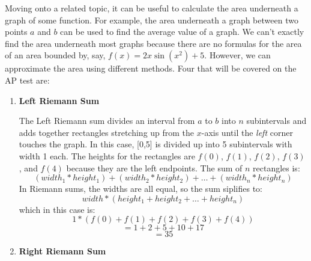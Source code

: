\documentclass[../revisedmain.tex]{subfiles}
\begin{document}
Moving onto a related topic, it can be useful to calculate the area underneath a graph of some function. For example, the area underneath a graph between two points $a$ and $b$ can be used to find the average value of a graph. We can't exactly find the area underneath most graphs because there are no formulas for the area of an area bounded by, say, $f(x)=2x\sin(x^2)+5$. However, we can approximate the area using different methods. Four that will be covered on the AP test are:
\newpage
\begin{enumerate}
	\item \textbf{Left Riemann Sum}
	\begin{center}
	\end{center}
	The Left Riemann sum divides an interval from $a$ to $b$ into $n$ subintervals and adds together rectangles stretching up from the $x$-axis until the \textit{left} corner touches the graph. In this case, [0,5] is divided up into 5 subintervals with width 1 each. The heights for the rectangles are $f(0)$, $f(1)$, $f(2)$, $f(3)$, and $f(4)$ because they are the left endpoints. The sum of $n$ rectangles is:$$(width_1*height_1) + (width_2*height_2) + \dots +(width_n*height_n)$$ In Riemann sums, the widths are all equal, so the sum siplifies to:$$width*(height_1+height_2+\dots+height_n)$$ which in this case is:$$1*\left(f(0)+f(1)+f(2)+f(3)+f(4)\right)$$$$=1+2+5+10+17$$$$=35$$
	\item \textbf{Right Riemann Sum}
		\begin{center}
\end{center}
\end{enumerate}
\end{document}
